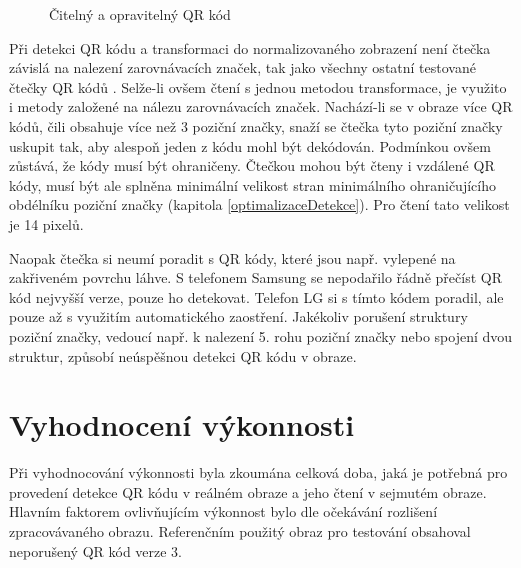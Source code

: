  \begin{figure}[H]
  \begin{center}
    \caption{Čitelný a opravitelný QR kód}
    \label{readableCodes}
  \end{center}
\end{figure}

Při detekci QR kódu a transformaci do
normalizovaného zobrazení není čtečka závislá na nalezení zarovnávacích značek,
tak jako všechny ostatní testované čtečky QR kódů
\cite{barcodeReaderZxing,scanLife,qrReaderForAndroid}. Selže-li ovšem čtení s
jednou metodou transformace, je využito i metody založené na nálezu zarovnávacích značek. Nachází-li se v obraze více QR kódů, čili obsahuje více
než 3 poziční značky, snaží se čtečka tyto poziční značky uskupit tak, aby
alespoň jeden z kódu mohl být dekódován. Podmínkou ovšem zůstává, že kódy musí
být ohraničeny. Čtečkou mohou být čteny i vzdálené QR kódy, musí být ale splněna
minimální velikost stran minimálního ohraničujícího obdélníku poziční značky
(kapitola \ref{optimalizaceDetekce}). Pro čtení tato velikost je 14 pixelů.

Naopak čtečka si neumí poradit s QR kódy, které jsou např. vylepené na
zakřiveném povrchu láhve. S telefonem Samsung se nepodařilo řádně přečíst QR kód
nejvyšší verze, pouze ho detekovat. Telefon LG si s tímto kódem poradil, ale
pouze až s využitím automatického zaostření. Jakékoliv porušení struktury
poziční značky, vedoucí např. k nalezení 5. rohu poziční značky nebo spojení
dvou struktur, způsobí neúspěšnou detekci QR kódu v obraze.

\section{Vyhodnocení výkonnosti}

Při vyhodnocování výkonnosti byla zkoumána celková doba, jaká je potřebná pro
provedení detekce QR kódu v reálném obraze a jeho čtení v sejmutém obraze.
Hlavním faktorem ovlivňujícím výkonnost bylo dle očekávání rozlišení
zpracovávaného obrazu. Referenčním použitý obraz pro testování obsahoval
neporušený QR kód verze 3.


